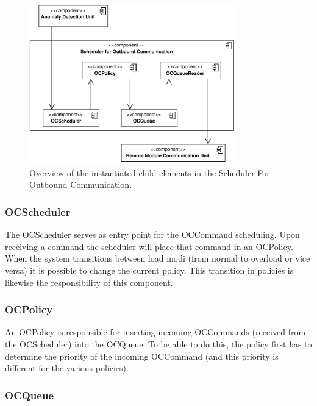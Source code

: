 \begin{figure}[H]
	\begin{centering}
		\includegraphics[width=0.8\textwidth]{figs/add-it7-elements.pdf}
		\caption{Overview of the instantiated child elements in the Scheduler For
		Outbound Communication.}
		\label{fig:it7/elements}
	\end{centering}
\end{figure}

\subsubsection{OCScheduler}

\npar The OCScheduler serves as entry point for the OCCommand scheduling. Upon
receiving a command the scheduler will place that command in an
OCPolicy. When the system transitions between load modi (from normal
to overload or vice versa) it is possible to change the current policy.
This transition in policies is likewise the responsibility of this component.

\subsubsection{OCPolicy}

\npar An OCPolicy is responsible for inserting incoming OCCommands (received
from the OCScheduler) into the OCQueue. To be able to do this, the policy first
has to determine the priority of the incoming OCCommand (and this priority is
different for the various policies).

\subsubsection{OCQueue}

